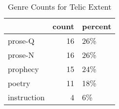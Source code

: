 \begin{table}[htbp!]
\centering
\caption{Genre Counts for Telic Extent}
\label{table:b2e_gen_cp}
\begin{tabular}{lrl}
\toprule
{} &  count & percent \\
\midrule
prose-Q     &     16 &     26\% \\
prose-N     &     16 &     26\% \\
prophecy    &     15 &     24\% \\
poetry      &     11 &     18\% \\
instruction &      4 &      6\% \\
\bottomrule
\end{tabular}
\end{table}
